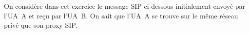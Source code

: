 
On considère dans cet exercice le message SIP ci-dessous initialement
envoyé par l'UA~A et reçu par l'UA~B. On sait que l'UA~A se trouve sur
le même réseau privé que son proxy SIP.


